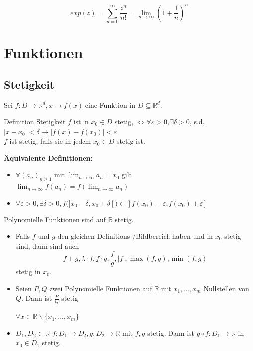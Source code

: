 \documentclass[a4paper,fontsize = 7pt]{scrartcl}
\def\limn{\lim_{n\to \infty}}
\def\R{\mathbb{R}}
\begin{document}
\begin{subbox}{}
  \vspace{-8pt}
  $$exp(z) = \sum_{n = 0}^{\infty} \frac{z^n}{n!} = \limn \left(1 + \frac{1}{n}\right)^n$$
  \vspace{-12pt}
\end{subbox}

\section{Funktionen}
\subsection{Stetigkeit}
Sei $f : D \to \R^d, x \to f(x)$ eine Funktion in $D \subseteq \R^d$.
\begin{mainbox}{Definition Stetigkeit}
  \vspace{-4pt}
 $f$ ist in $x_0 \in D$ stetig, $\iff \forall \varepsilon > 0, \exists \delta > 0$, s.d. $|x-x_0|<\delta \to |f(x)-f(x_0)| < \varepsilon$
 \\$f$ ist stetig, falls sie in jedem $x_0 \in D$ stetig ist. 
 \vspace{-4pt}
\end{mainbox}
\textbf{Äquivalente Definitionen:} 
\begin{itemize}
 \item $\forall(a_n)_{n \geq 1}$ mit $\limn a_n = x_0$ gilt \\ $\limn f(a_n) = f(\limn a_n)$
 \item $\forall \varepsilon > 0, \exists \delta >0, f(]x_0 - \delta, x_0 + \delta[) \subset  ]f(x_0) - \varepsilon, f(x_0) + \varepsilon[$
\end{itemize}
Polynomielle Funktionen sind auf $\R$ stetig.
\begin{subbox}{}
  \vspace{-8pt}
  \begin{itemize}
    \item Falls $f$ und $g$ den gleichen Definitions-/Bildbereich haben und in $x_0$ stetig sind, dann sind auch
    $$f + g, \lambda \cdot f, f \cdot g, \frac{f}{g}, |f|, \max(f,g), \min(f,g)$$ 
    stetig in $x_0$.
    \item Seien $P,Q$ zwei Polynomielle Funktionen auf $\R$ mit $x_1, ..., x_m$ Nullstellen von $Q$. Dann ist $\frac{P}{Q}$ stetig 
    
    $\forall x \in \R \backslash \{x_1, ..., x_m\}$
    \item $D_1, D_2 \subset \R$ $f: D_1 \to D_2, g: D_2 \to \R$ mit $f, g$ stetig. Dann ist $g \circ f: D_1 \to \R$ in $x_0 \in D_1$ stetig.   
  \end{itemize}
  \vspace{-12pt}
\end{subbox}
\end{document}
